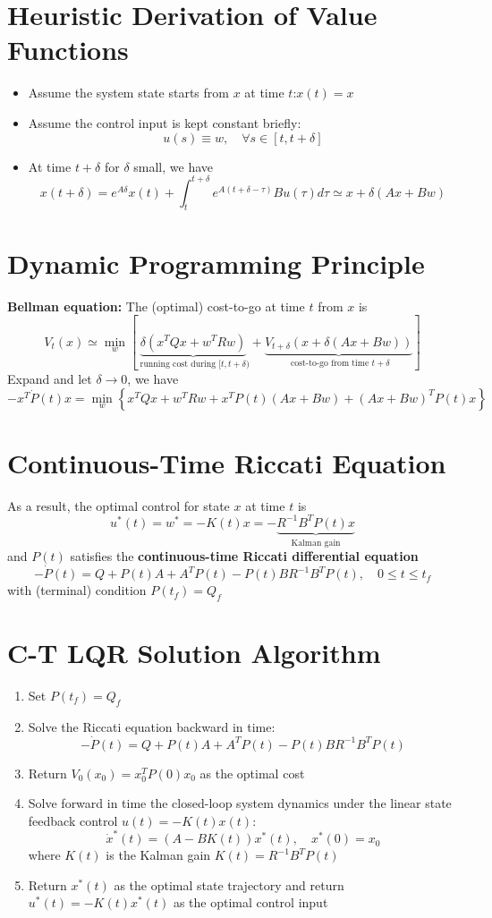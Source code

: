 \documentclass[10pt,a4paper,oneside]{article}
\begin{document}
\section{Heuristic Derivation of Value Functions}
\begin{itemize}
\item Assume the system state starts from $x$ at time $t$:$x(t)=x$
\item Assume the control input is kept constant briefly:
$$
u(s) \equiv w, \quad \forall s \in[t, t+\delta]
$$
\item At time $t+\delta$ for $\delta$ small, we have
$$
x(t+\delta)=e^{A \delta} x(t)+\int_{t}^{t+\delta} e^{A(t+\delta-\tau)} B u(\tau) d \tau \simeq x+\delta(A x+B w)
$$
\end{itemize}
\section{Dynamic Programming Principle}
{\bfseries Bellman equation:} The (optimal) cost-to-go at time $t$ from $x$ is
$$
V_{t}(x) \simeq \min _{w}\left[\underbrace{\delta\left(x^{T} Q x+w^{T} R w\right)}_{\text { running cost during }[t, t+\delta)}+\underbrace{V_{t+\delta}(x+\delta(A x+B w))}_{\text { cost-to-go from time } t+\delta}\right]
$$
Expand and let $\delta\rightarrow0$, we have
$$
-x^{T} \dot{P}(t) x=\min _{w}\left\{x^{T} Q x+w^{T} R w+x^{T} P(t)(A x+B w)+(A x+B w)^{T} P(t) x\right\}
$$
\section{Continuous-Time Riccati Equation}
As a result, the optimal control for state $x$ at time $t$ is
$$
u^{*}(t)=w^{*}=-K(t) x=
-\underbrace{R^{-1} B^{T} P(t)x}_{\text { Kalman gain }}
$$
and $P(t)$ satisfies the {\bfseries continuous-time Riccati differential equation}
$$
-\dot{P}(t)=Q+P(t) A+A^{T} P(t)-P(t) B R^{-1} B^{T} P(t), \quad 0 \leqslant t \leqslant t_{f}
$$
with (terminal) condition $P(t_f)=Q_f$
\section{C-T LQR Solution Algorithm}
\begin{enumerate}[1.]
\item Set $P(t_f)=Q_f$
\item Solve the Riccati equation backward in time:
\[
-\dot{P}(t)=Q+P(t) A+A^{T} P(t)-P(t) B R^{-1} B^{T} P(t)
\]
\item Return $V_0(x_0)=x_0^TP(0)x_0$ as the optimal cost
\item Solve forward in time the closed-loop system dynamics under the linear state feedback control $u(t)=-K(t)x(t):$
$$
\dot{x}^{*}(t)=(A-B K(t)) x^{*}(t), \quad x^{*}(0)=x_{0}
$$
where $K(t)$ is the Kalman gain $K(t)=R^{-1}B^TP(t)$
\item Return $x^*(t)$ as the optimal state trajectory and return $u^*(t)=-K(t)x^*(t)$ as the optimal control input
\end{enumerate}
\end{document}
